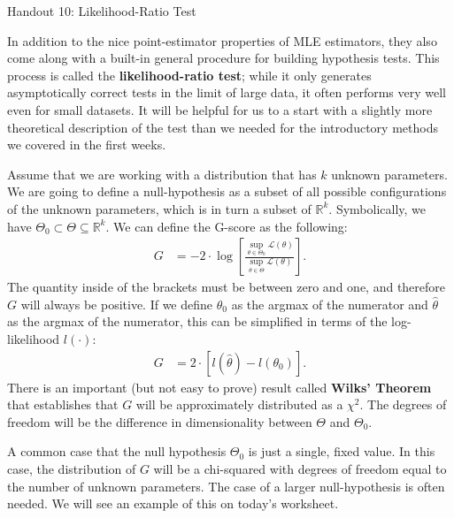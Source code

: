 \documentclass{tufte-handout}
\begin{document}
\justify

{\LARGE Handout 10: Likelihood-Ratio Test}

\vspace*{18pt}

\noindent
In addition to the nice point-estimator properties of MLE estimators,
they also come along with a built-in general procedure for building 
hypothesis tests. This process is called the \textbf{likelihood-ratio test};
while it only generates asymptotically correct tests in the limit of large
data, it often performs very well even for small datasets. It will be
helpful for us to a start with a slightly more theoretical description
of the test than we needed for the introductory methods we covered in the
first weeks.

Assume that we are working with a distribution that has $k$ unknown
parameters. We are going to define a null-hypothesis as a subset of
all possible configurations of the unknown parameters, which is in
turn a subset of $\mathbb{R}^k$. Symbolically, we have 
$\Theta_0 \subset \Theta \subseteq \mathbb{R}^k$. We can define the
G-score as the following:
\begin{align*}
G &= -2 \cdot \log \left[ \frac{
  \sup_{\theta \in \Theta_0} \mathcal{L}(\theta)
}{
  \sup_{\theta \in \Theta} \mathcal{L}(\theta)
} \right].
\end{align*}
The quantity inside of the brackets must be between zero and one, and
therefore $G$ will always be positive. If we define $\theta_0$ as the
argmax of the numerator and $\hat{\theta}$ as the argmax of the numerator,
this can be simplified in terms of the log-likelihood $l(\cdot)$:
\begin{align*}
G &= 2 \cdot \left[ l(\hat{\theta}) - l(\theta_0) \right].
\end{align*}
There is an important (but not easy to prove) result called
\textbf{Wilks' Theorem} that establishes that $G$ will be 
approximately distributed as a $\chi^2$. The degrees of freedom
will be the difference in dimensionality between $\Theta$ and
$\Theta_0$. 

A common case that the null hypothesis $\Theta_0$ is just a
single, fixed value. In this case, the distribution of $G$ will
be a chi-squared with degrees of freedom equal to the number of
unknown parameters. The case of a larger null-hypothesis is
often needed. We will see an example of this on today's worksheet.
\end{document}
